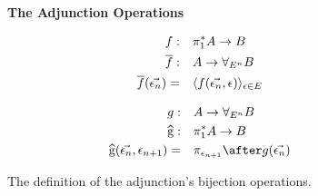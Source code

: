 \begin{figure}
    \begin{framed}
        \centering
        \textbf{The Adjunction Operations}

        \begin{minipage}{0.45\linewidth}
            \begin{align*}
                f:&\quad \pi_1^* A \rightarrow B\\
                \overline{f}:&\quad A\rightarrow \forall_{E^n} B\\
                \overline{f}(\vec{\epsilon_n}) =&\quad \langle f(\vec{\epsilon_n}, \epsilon)\rangle_{\epsilon\in E}
            \end{align*}
        \end{minipage}
        \quad
        \begin{minipage}{0.45\linewidth}
            
        \begin{align*}
            g:&\quad A \rightarrow \allEn B\\
            \widehat{g}:&\quad \pstar A\rightarrow B\\
            \widehat{g}(\env, \e_{n+1}) =&\quad\pi_{\e_{n+1}}\after g(\env)
        \end{align*}
        \end{minipage}
    \end{framed}

    \caption{The definition of the adjunction's bijection operations.}
    \label{AdjunctionDefinition}
\end{figure}




